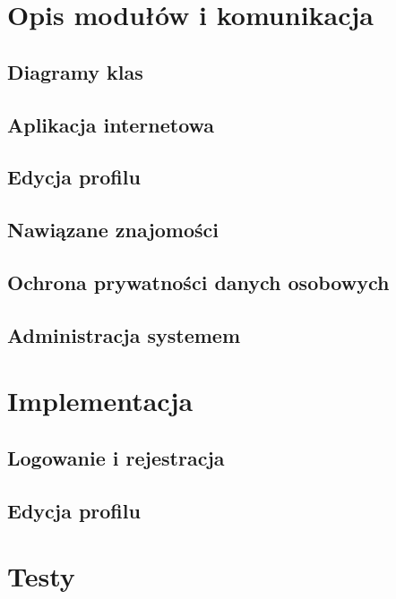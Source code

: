 \documentclass[12pt,twoside,a4paper]{article}
\begin{document}
\newpage
\section{Opis modułów i komunikacja}
	
	\subsection{Diagramy klas}\label{kom-diagram-klas}	
		


	\subsection{Aplikacja internetowa}

	\subsection{Edycja profilu}
		
	\subsection{Nawiązane znajomości}
	
	\subsection{Ochrona prywatności danych osobowych}
		
	\subsection{Administracja systemem}

\newpage
\section{Implementacja}\label{sec:implementacja}
	
	\subsection{Logowanie i rejestracja}
	  

	\subsection{Edycja profilu}
\newpage	
\section{Testy}\label{sec:testy}
  
\end{document}

